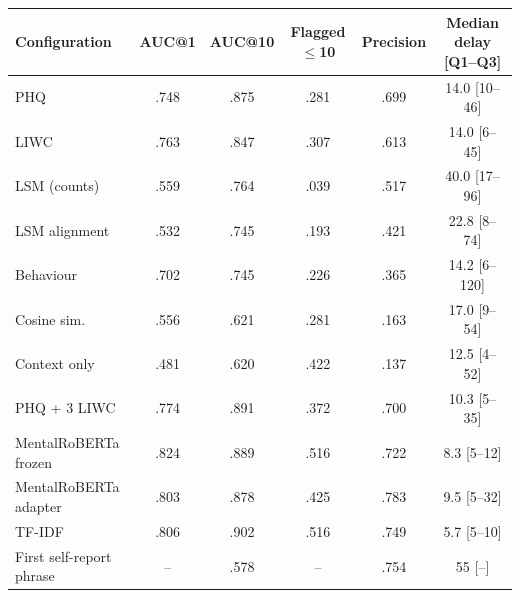 \begin{tabular}{lccccc}
\toprule
Configuration & AUC@1 & AUC@10 & Flagged $\leq$10 & Precision & Median delay [Q1--Q3] \\
\midrule
PHQ & .748 & .875 & .281 & .699 & 14.0 [10--46] \\
LIWC & .763 & .847 & .307 & .613 & 14.0 [6--45] \\
LSM (counts) & .559 & .764 & .039 & .517 & 40.0 [17--96] \\
LSM alignment & .532 & .745 & .193 & .421 & 22.8 [8--74] \\
Behaviour & .702 & .745 & .226 & .365 & 14.2 [6--120] \\
Cosine sim. & .556 & .621 & .281 & .163 & 17.0 [9--54] \\
Context only & .481 & .620 & .422 & .137 & 12.5 [4--52] \\
PHQ + 3 LIWC & .774 & .891 & .372 & .700 & 10.3 [5--35] \\
MentalRoBERTa frozen & .824 & .889 & .516 & .722 & 8.3 [5--12] \\
MentalRoBERTa adapter & .803 & .878 & .425 & .783 & 9.5 [5--32] \\
TF-IDF & .806 & .902 & .516 & .749 & 5.7 [5--10] \\
First self-report phrase & -- & .578 & -- & .754 & 55 [--] \\
\bottomrule
\end{tabular}
